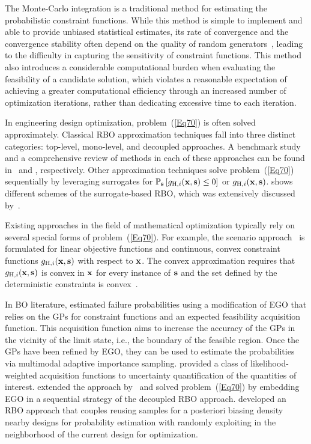 \documentclass[iicol,sn-basic]{sn-jnl}%
\begin{document}
The Monte-Carlo integration is a traditional method for estimating the probabilistic constraint functions.
While this method is simple to implement and able to provide unbiased statistical estimates, its rate of convergence and the convergence stability often depend on the quality of random generators~\citep{Melchers2018}, leading to the difficulty in capturing the sensitivity of constraint functions.
This method also introduces a considerable computational burden when evaluating the feasibility of a candidate solution, which violates a reasonable expectation of achieving a greater computational efficiency through an increased number of optimization iterations, rather than dedicating excessive time to each iteration.

In engineering design optimization, problem~(\ref{Eq70}) is often solved approximately.
Classical RBO approximation techniques fall into three distinct categories: top-level, mono-level, and decoupled approaches.
A benchmark study and a comprehensive review of methods in each of these approaches can be found in~\cite{Aoues2010} and \cite{Valdebenito2010}, respectively.
Other approximation techniques solve problem~(\ref{Eq70}) sequentially by leveraging surrogates for $\mathbb{P}_{\bf s}\left[g_{\text{H},i}({\bf x},{\bf s}) \leq 0\right]$ or $g_{\text{H},i}({\bf x},{\bf s})$.
 shows different schemes of the surrogate-based RBO, which was extensively discussed by~\cite{Moustapha2019}.  

Existing approaches in the field of mathematical optimization typically rely on several special forms of problem~(\ref{Eq70}).
For example, the scenario approach~\citep{Calafiore2006} is formulated for linear objective functions and continuous, convex constraint functions $g_{\text{H},i}({\bf x},{\bf s})$ with respect to ${\bf x}$.
The convex approximation requires that $g_{\text{H},i}({\bf x},{\bf s})$ is convex in ${\bf x}$ for every instance
of ${\bf s}$ and the set defined by the deterministic constraints is convex~\citep{Nemirovski2012}.

In BO literature, \cite{Bichon2008} estimated failure probabilities using a modification of EGO that relies on the GPs for constraint functions and an expected feasibility acquisition function.
This acquisition function aims to increase the accuracy of the GPs in the vicinity of the limit state, i.e., the boundary of the feasible region. 
Once the GPs have been refined by EGO, they can be used to estimate the probabilities via multimodal adaptive importance sampling.
\cite{Blanchard2021siamjuq} provided a class of likelihood-weighted acquisition functions to uncertainty quantification of the quantities of interest.
\cite{Huynh2023} extended the approach by~\cite{Bichon2008} and solved problem~(\ref{Eq70}) by embedding EGO in a sequential strategy of the decoupled RBO approach.
\cite{Chaudhuri2020} developed an RBO approach that couples reusing samples for a posteriori biasing density nearby designs for probability estimation with randomly exploiting in the neighborhood of the current design for optimization.
\end{document}
